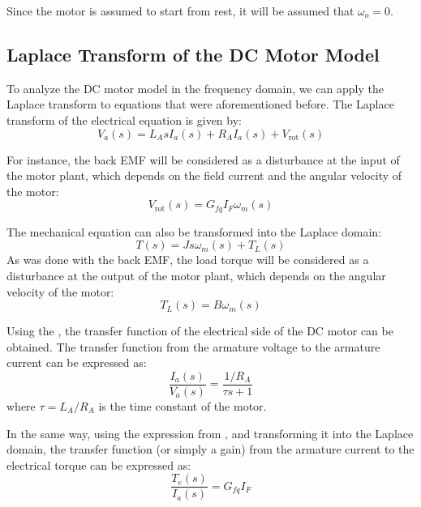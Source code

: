 Since the motor is assumed to start from rest, it will be assumed that $\omega_o = 0$.

\subsection{Laplace Transform of the DC Motor Model}
To analyze the DC motor model in the frequency domain, we can apply the Laplace transform to equations that were aforementioned before. The Laplace transform of the electrical equation is given by:
\begin{equation}\label{eq:ElectricalLaplace}
    V_a(s) = L_A s I_a(s) + R_A I_a(s) + V_{\text{rot}}(s)
\end{equation}

For instance, the back EMF will be considered as a disturbance at the input of the motor plant, which depends on the field current and the angular velocity of the motor:
\begin{equation}
    V_{\text{rot}}(s) = G_{fq} I_F \omega_m(s)
\end{equation}

The mechanical equation can also be transformed into the Laplace domain:
\begin{equation}\label{eq:MechanicalLaplace}
    T(s) = J s \omega_m(s) + T_L(s)
\end{equation}
As was done with the back EMF, the load torque will be considered as a disturbance at the output of the motor plant, which depends on the angular velocity of the motor:
\begin{equation}\label{eq:LoadTorqueLaplace}
    T_L(s) = B \omega_m(s)
\end{equation}

Using the , the transfer function of the electrical side of the DC motor can be obtained. The transfer function from the armature voltage to the armature current can be expressed as:
\begin{equation}
    \dfrac{I_a(s)}{V_a(s)} = \dfrac{1/R_A}{\tau s + 1}
\end{equation}
where $\tau = L_A/R_A$ is the time constant of the motor.

In the same way, using the expression from , and transforming it into the Laplace domain, the transfer function (or simply a gain) from the armature current to the electrical torque can be expressed as:
\begin{equation}
    \dfrac{T_e(s)}{I_a(s)} = G_{fq} I_F
\end{equation}


